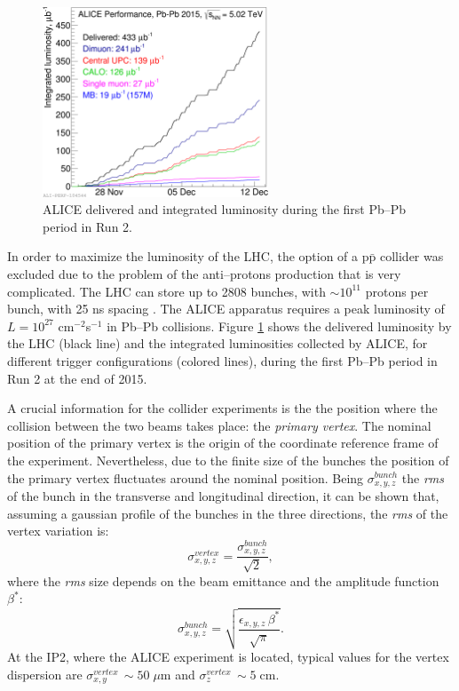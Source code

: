 \begin{figure}
    \centering
    \includegraphics[width=0.6\textwidth]{gfx/alicelumi}
	\caption{ALICE delivered and integrated luminosity during the first Pb–Pb period in Run 2.}
	\label{fig:alicelumi}
\end{figure}

In order to maximize the luminosity of the LHC, the option of a p$\bar{\mathrm{p}}$ collider
was excluded due to the problem of the anti–protons production that is very complicated.
The LHC can store up to 2808 bunches, with $\sim 10^{11}$ protons per bunch, with 25 ns spacing
\cite{lhcperf}.
The ALICE apparatus requires a peak luminosity of $L = 10^{27}$ cm$^{-2}$s$^{-1}$ in Pb--Pb collisions.
Figure \ref{fig:alicelumi} shows the delivered luminosity by the LHC (black line) and the integrated
luminosities collected by ALICE, for different trigger configurations (colored lines), during the
first Pb–Pb period in Run 2 at the end of 2015.

A crucial information for the collider experiments is the the position where the collision
between the two beams takes place: the \textit{primary vertex}. 
The nominal position of the primary vertex is the origin of the coordinate reference frame of the 
experiment. Nevertheless, due to the finite size of the bunches the position of the primary
vertex fluctuates around the nominal position.
Being $\sigma^{bunch}_{x,y,z}$ the \textit{rms} of the bunch in the transverse and longitudinal
direction, it can be shown that, assuming a gaussian profile of the bunches in the three directions,
the \textit{rms} of the vertex variation is:
\begin{equation}
    \sigma^{vertex}_{x,y,z} = \frac{\sigma^{bunch}_{x,y,z}}{\sqrt{2}},
\end{equation}
where the \textit{rms} size depends on the beam emittance and the amplitude function $\beta^{*}$:
\begin{equation}
    \sigma^{bunch}_{x,y,z} = \sqrt{\frac{\epsilon_{x,y,z}\,\beta^{*}}{\sqrt{\pi}}}.
\end{equation}
At the IP2, where the ALICE experiment is located, typical values for the vertex dispersion are 
$\sigma^{vertex}_{x,y}\,\sim 50\;\mu\mathrm{m}$ and $\sigma^{vertex}_{z}\,\sim 5\;\mathrm{cm}$.

